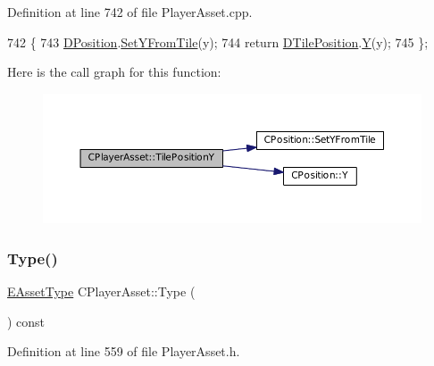 Definition at line 742 of file Player\+Asset.\+cpp.


\begin{DoxyCode}
742                                     \{
743     \hyperlink{classCPlayerAsset_aa9f53c009b181c7c5647c6b03776a04c}{DPosition}.\hyperlink{classCPosition_a4be1caa5ce58297e9d371f6bc1db32d9}{SetYFromTile}(y);
744     \textcolor{keywordflow}{return} \hyperlink{classCPlayerAsset_a5b59a9d3b7db8c7fa194b80dafb96186}{DTilePosition}.\hyperlink{classCPosition_a1aa8a30e2f08dda1f797736ba8c13a87}{Y}(y);
745 \};
\end{DoxyCode}
Here is the call graph for this function\+:
\nopagebreak
\begin{figure}[H]
\begin{center}
\leavevmode
\includegraphics[width=350pt]{classCPlayerAsset_ad3ce562cbd27e2c35abe968a7ff19cd6_cgraph}
\end{center}
\end{figure}
\hypertarget{classCPlayerAsset_a6d6aeea4e8b02e0f239bac95db6d9e0a}{}\label{classCPlayerAsset_a6d6aeea4e8b02e0f239bac95db6d9e0a} 
\subsubsection{\texorpdfstring{Type()}{Type()}}
{\footnotesize\ttfamily \hyperlink{GameDataTypes_8h_a5600d4fc433b83300308921974477fec}{E\+Asset\+Type} C\+Player\+Asset\+::\+Type (\begin{DoxyParamCaption}{ }\end{DoxyParamCaption}) const\hspace{0.3cm}{\ttfamily [inline]}}



Definition at line 559 of file Player\+Asset.\+h.


